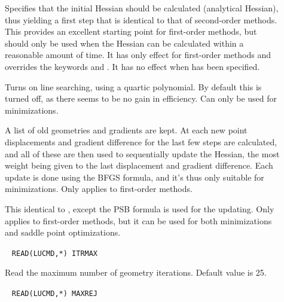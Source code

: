 \begin{description}
\item[]
Specifies that the initial Hessian should be
calculated (analytical Hessian), thus yielding a first step that is
identical to that of second-order methods. This provides an excellent starting
point for first-order methods, but should only be used when the
Hessian can be calculated within a reasonable amount of time. It has only
effect for first-order methods and overrides the keywords
 and . It has no effect when  has
been specified.


\item[]
Turns on line searching, using a quartic polynomial. By default this
is turned off, as there seems to be no gain in efficiency. Can only be
used for minimizations.

\item[]
A list of old geometries and gradients are kept. At each new point
displacements and gradient difference for the last few steps are
calculated, and all of these are then used to sequentially update the
Hessian, the most weight being given to the last displacement and
gradient difference. Each update is done using the BFGS formula, and
it's thus only suitable for minimizations. Only applies to first-order
methods.

\item[]
This identical to , except the PSB formula is used for the
updating. Only applies to first-order methods, but it can be used for both minimizations and saddle
point optimizations.

\item[]\verb| |
\newline
\verb|READ(LUCMD,*) ITRMAX|

Read the maximum number of geometry iterations. Default value is 25.

\item[]\verb| |
\newline
\verb|READ(LUCMD,*) MAXREJ|


\end{description}
